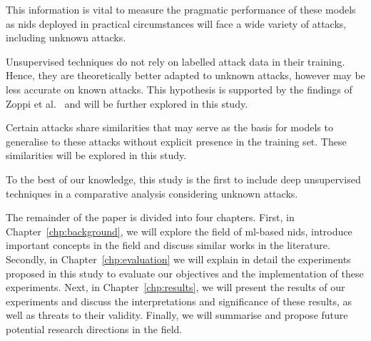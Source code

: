 \begin{center}
\end{center}

This information is vital to measure the pragmatic performance of these models
as \gls{nids} deployed in practical circumstances will face a wide variety of
attacks, including unknown attacks.

\begin{center}
\end{center}

Unsupervised techniques do not rely on labelled attack data in their training.
Hence, they are theoretically better adapted to unknown attacks, however may be
less accurate on known attacks. This hypothesis is supported by the findings of
Zoppi et al.~\cite{Zoppi} and will be further explored in this study.

\begin{center}
\end{center}

Certain attacks share similarities that may serve as the basis for models to
generalise to these attacks without explicit presence in the training set.
These similarities will be explored in this study.

To the best of our knowledge, this study is the first to include deep
unsupervised techniques in a comparative analysis considering unknown attacks.

The remainder of the paper is divided into four chapters. First, in
Chapter~\ref{chp:background}, we will explore the field of \gls{ml}-based
\gls{nids}, introduce important concepts in the field and discuss similar works
in the literature. Secondly, in Chapter~\ref{chp:evaluation} we will explain in
detail the experiments proposed in this study to evaluate our objectives and
the implementation of these experiments. Next, in Chapter~\ref{chp:results},
we will present the results of our experiments and discuss the interpretations
and significance of these results, as well as threats to their validity.
Finally, we will summarise and propose future potential research directions in
the field.
